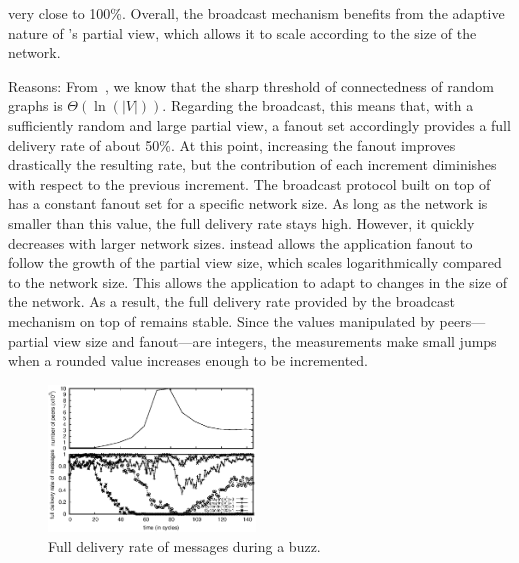 \begin{asparadesc}
  very close to 100\%. Overall, the broadcast mechanism benefits from
  the adaptive nature of \SPRAY's partial view, which allows it to
  scale according to the size of the network.
\item [Reasons:] From~\cite{erdos1959random}, we know that the sharp
  threshold of connectedness of random graphs is
  $\Theta(\ln(|V|))$. Regarding the broadcast, this means that, with a
  sufficiently random and large partial view, a fanout set accordingly
  provides a full delivery rate of about 50\%. At this point,
  increasing the fanout improves drastically the resulting rate, but
  the contribution of each increment diminishes with respect to the
  previous increment. The broadcast protocol built on top of \CYCLON
  has a constant fanout set for a specific network size. As long as
  the network is smaller than this value, the full delivery rate stays
  high. However, it quickly decreases with larger network sizes.
  \SPRAY instead allows the application fanout to follow the growth of
  the partial view size, which scales logarithmically compared to the
  network size. This allows the application to adapt to changes in the
  size of the network. As a result, the full delivery rate provided by
  the broadcast mechanism on top of \SPRAY remains stable. Since the
  values manipulated by peers---partial view size and fanout---are
  integers, the measurements make small jumps when a rounded value
  increases enough to be incremented.
\end{asparadesc}




\begin{figure}
  \begin{center}
    \includegraphics[width=0.49\textwidth]{img/peak.eps}
    \caption{\label{fig:peak}Full delivery rate of messages during a buzz.}
  \end{center}
\end{figure}

